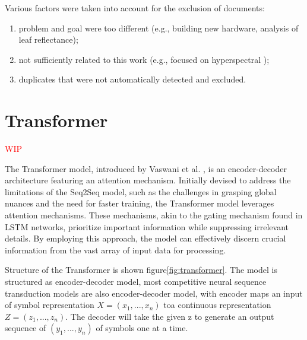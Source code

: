 Various factors were taken into account for the exclusion of documents:
\begin{enumerate}
    \item problem and goal were too different (e.g., building new hardware, analysis of leaf reflectance);
    \item not sufficiently related to this work (e.g., focused on hyperspectral );
    \item duplicates that were not automatically detected and excluded.
\end{enumerate}




\section{Transformer}
\textcolor{red}{WIP}

The Transformer model, introduced by Vaswani et al. \cite{vaswani2023attention}, is an encoder-decoder architecture featuring an attention mechanism. Initially devised to address the limitations of the Seq2Seq model, such as the challenges in grasping global nuances and the need for faster training, the Transformer model leverages attention mechanisms. These mechanisms, akin to the gating mechanism found in LSTM networks, prioritize important information while suppressing irrelevant details. By employing this approach, the model can effectively discern crucial information from the vast array of input data for processing.

Structure of the Transformer is shown figure\ref{fig:transformer}. The model is structured as encoder-decoder model, most competitive neural sequence transduction models are also encoder-decoder model, with encoder maps an input of symbol representation $X=(x_1, ...,x_n)$ toa continuous representation $Z=(z_1,...,z_n)$. The decoder will take the given z to generate an output sequence of $(y_1,...,y_n)$ of symbols one at a time.

